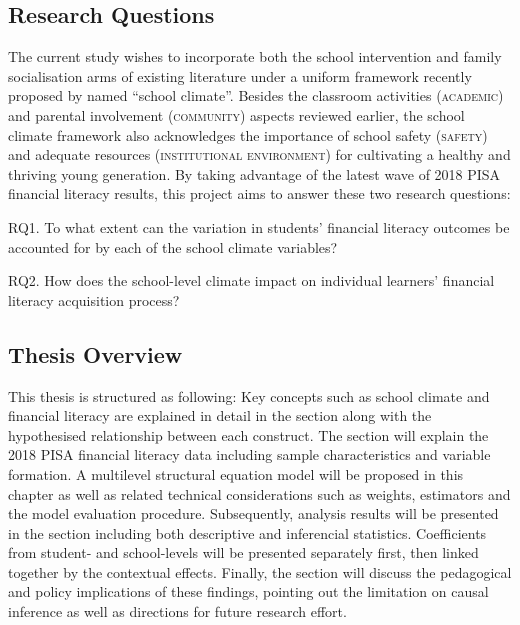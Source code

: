 \subsection{Research Questions}

The current study wishes to incorporate both the school intervention and family socialisation arms of existing literature under a uniform framework recently proposed by \textcite{wang:2016} named ``school climate''. Besides the classroom activities (\textsc{academic}) and parental involvement (\textsc{community}) aspects reviewed earlier, the school climate framework also acknowledges the importance of school safety (\textsc{safety}) and adequate resources (\textsc{institutional environment}) for cultivating a healthy and thriving young generation. By taking advantage of the latest wave of 2018 PISA financial literacy results, this project aims to answer these two research questions:
\begin{MAEitemize}
    \item[RQ1.] To what extent can the variation in students' financial literacy outcomes be accounted for by each of the school climate variables?
    \item[RQ2.] How does the school-level climate impact on individual learners' financial literacy acquisition process?
\end{MAEitemize}

\subsection{Thesis Overview}

This thesis is structured as following: Key concepts such as school climate and financial literacy are explained in detail in the  section along with the hypothesised relationship between each construct. The  section will explain the 2018 PISA financial literacy data including sample characteristics and variable formation. A multilevel structural equation model will be proposed in this chapter as well as related technical considerations such as weights, estimators and the model evaluation procedure. Subsequently, analysis results will be presented in the  section including both descriptive and inferencial statistics. Coefficients from student- and school-levels will be presented separately first, then linked together by the contextual effects. Finally, the  section will discuss the pedagogical and policy implications of these findings, pointing out the limitation on causal inference as well as directions for future research effort.